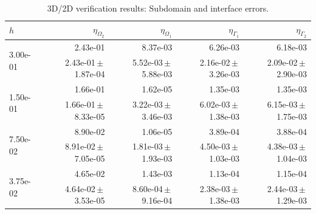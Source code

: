 \begin{table}
\centering
\caption{3D/2D verification results: Subdomain and interface errors.}
\label{tab:verification_local}
\begin{tabular}{lrrrr}
\hline
$h$ & $\eta_{\Omega_2}$ & $\eta_{\Omega_1}$ & $\eta_{\Gamma_1}$ & $\eta_{\Gamma_2}$ \\
\toprule
\multirow{2}{*}{3.00e-01} & 2.43e-01 & 8.37e-03 & 6.26e-03 & 6.18e-03 \\
 & 2.43e-01\,$\pm$\,1.87e-04 & 5.52e-03\,$\pm$\,5.88e-03 & 2.16e-02\,$\pm$\,3.26e-03 & 2.09e-02\,$\pm$\,2.90e-03 \\
\midrule
\multirow{2}{*}{1.50e-01} & 1.66e-01 & 1.62e-05 & 1.35e-03 & 1.35e-03 \\
 & 1.66e-01\,$\pm$\,8.33e-05 & 3.22e-03\,$\pm$\,3.46e-03 & 6.02e-03\,$\pm$\,1.38e-03 & 6.15e-03\,$\pm$\,1.75e-03 \\
\midrule
\multirow{2}{*}{7.50e-02} & 8.90e-02 & 1.06e-05 & 3.89e-04 & 3.88e-04 \\
 & 8.91e-02\,$\pm$\,7.05e-05 & 1.81e-03\,$\pm$\,1.93e-03 & 4.50e-03\,$\pm$\,1.03e-03 & 4.38e-03\,$\pm$\,1.04e-03 \\
\midrule
\multirow{2}{*}{3.75e-02} & 4.65e-02 & 1.43e-03 & 1.13e-04 & 1.15e-04 \\
 & 4.64e-02\,$\pm$\,3.53e-05 & 8.60e-04\,$\pm$\,9.16e-04 & 2.38e-03\,$\pm$\,1.38e-03 & 2.44e-03\,$\pm$\,1.29e-03 \\
\bottomrule
\end{tabular}
\end{table}
